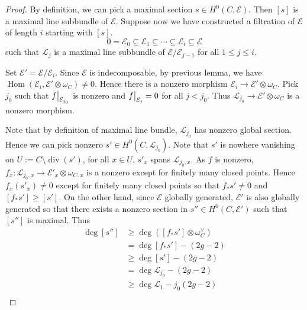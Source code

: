 \documentclass{ctexart}
\renewcommand{\hom}{\operatorname{Hom}}
\newcommand{\divisor}{\operatorname{div}}
\begin{document}
\begin{proof}
    By definition, we can pick a maximal section $s\in H^{0}(C, \mathcal{E})$.
    Then $[s]$ is a maximal line subbundle of $\mathcal{E}$.
    Suppose now we have constructed a filtration of $\mathcal{E}$ of length $i$ starting with $[s]$.
    \begin{equation}
        0 = \mathcal{E}_{0} \subseteq \mathcal{E}_{1} \subseteq \cdots \subseteq \mathcal{E}_{i} \subseteq \mathcal{E}
    \end{equation}
    such that $\mathcal{L}_{j}$ is a maximal line subbundle of $\mathcal{E}/\mathcal{E}_{j - 1}$ for all $1 \le j \le i$.
    \par
    Set $\mathcal{E}' = \mathcal{E}/\mathcal{E}_{i}$.
    Since $\mathcal{E}$ is indecomposable, by previous lemma, we have $\hom(\mathcal{E}_{i}, \mathcal{E}' \otimes \omega_{C}) \neq 0$.
    Hence there is a nonzero morphism $\mathcal{E}_{i} \rightarrow \mathcal{E}' \otimes \omega_{C}$.
    Pick $j_{0}$ such that $f\big{|}_{\mathcal{E}_{j_{0}}}$ is nonzero and $f\big{|}_{\mathcal{E}_{j}} = 0$ for all $j < j_{0}$.
    Thus $\mathcal{L}_{j_{0}} \rightarrow \mathcal{E}' \otimes \omega_{C}$ is a nonzero morphism.
    \par
    Note that by definition of maximal line bundle, $\mathcal{L}_{j_{0}}$ has nonzero global section.
    Hence we can pick nonzero $s'\in H^{0}(C, \mathcal{L}_{j_{0}})$.
    Note that $s'$ is nowhere vanishing on $U := C \setminus \divisor (s')$,
    for all $x \in U$, $s'_{x}$ spans $\mathcal{L}_{j_{0}, x}$.
    As $f$ is nonzero, $f_{x}: \mathcal{L}_{j_{0}, x} \rightarrow \mathcal{E}'_{x} \otimes \omega_{C, x}$ is a nonzero except for finitely many closed points.
    Hence $f_{x}(s'_{x}) \neq 0$ except for finitely many closed points so that $f_{\ast}s' \neq 0$ and $[f_{\ast}s'] \ge [s']$.
    On the other hand, since $\mathcal{E}$ globally generated, $\mathcal{E}'$ is also globally generated so that there exists a nonzero section in $s''\in H^{0}(C, \mathcal{E}')$ such that $[s'']$ is maximal.
    Thus
    \begin{equation}
        \begin{split}
            \deg [s''] & \ge \deg ([f_{\ast}s'] \otimes \omega_{C}^{\vee}) \\
            & = \deg [f_{\ast}s'] - (2g - 2) \\
            & \ge \deg [s'] - (2g - 2) \\
            & = \deg \mathcal{L}_{j_{0}} - (2g - 2) \\
            & \ge \deg \mathcal{L}_{1} - j_{0}(2g - 2) \\

\end{split}
\end{equation}
\end{proof}
\end{document}
